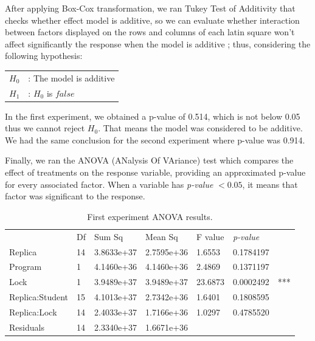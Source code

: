 After applying Box-Cox transformation, we ran Tukey Test of Additivity that checks whether effect model is additive, so we can evaluate whether interaction between factors displayed on the rows and columns of each latin square won't affect significantly the response when the model is additive \cite{box}; thus, considering the following hypothesis:

\begin{tabular}{ll}
$H_{0}$ & : The model is additive \\
$H_{1}$ & : $H_{0}$ is $false$ \\
\end{tabular}

In the first experiment, we obtained a p-value of 0.514, which is not below 0.05 thus we cannot reject $H_{0}$. That means the model was considered to be additive. We had the same conclusion for the second experiment where p-value was 0.914.

Finally, we ran the ANOVA (ANalysis Of VAriance) test which compares the effect of treatments on the response variable, providing an approximated p-value for every associated factor. When a variable has \emph{p-value} $< 0.05$, it means that factor was significant to the response.

\begin{table}
\begin{center}
\caption{First experiment ANOVA results.}
\begin{tabular}{|l|l|l|l|l|ll|}
\hline
                & Df &    Sum Sq  &  Mean Sq   & F value & \emph{p-value} &     \\  
Replica         & 14 & 3.8633e+37 & 2.7595e+36 & 1.6553  & 0.1784197 &     \\   
Program         & 1  & 4.1460e+36 & 4.1460e+36 & 2.4869  & 0.1371197 &     \\   
Lock            & 1  & 3.9489e+37 & 3.9489e+37 & 23.6873 & 0.0002492 & *** \\
Replica:Student & 15 & 4.1013e+37 & 2.7342e+36 & 1.6401  & 0.1808595 &     \\  
Replica:Lock    & 14 & 2.4033e+37 & 1.7166e+36 & 1.0297  & 0.4785520 &     \\  
Residuals       & 14 & 2.3340e+37 & 1.6671e+36 &         &           &     \\
\hline
\end{tabular}
\end{center}
\end{table}

